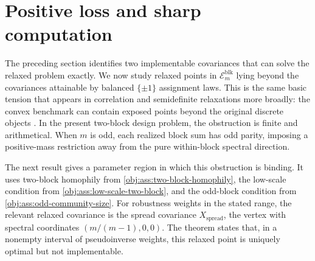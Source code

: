 \section{Positive loss and sharp computation}

The preceding section identifies two implementable covariances that can solve the relaxed problem exactly. We now study relaxed points in \(\mathcal E_m^{\mathrm{blk}}\) lying beyond the covariances attainable by balanced \(\{\pm1\}\) assignment laws. This is the same basic tension that appears in correlation and semidefinite relaxations more broadly: the convex benchmark can contain exposed points beyond the original discrete objects \citep{goemans1995,deza1997}. In the present two-block design problem, the obstruction is finite and arithmetical. When \(m\) is odd, each realized block sum has odd parity, imposing a positive-mass restriction away from the pure within-block spectral direction.

The next result gives a parameter region in which this obstruction is binding. It uses two-block homophily from \cref{obj:ass:two-block-homophily}, the low-scale condition from \cref{obj:ass:low-scale-two-block}, and the odd-block condition from \cref{obj:ass:odd-community-size}. For robustness weights in the stated range, the relevant relaxed covariance is the spread covariance \(X_{\mathrm{spread}}\), the vertex with spectral coordinates \((m/(m-1),0,0)\). The theorem states that, in a nonempty interval of pseudoinverse weights, this relaxed point is uniquely optimal but not implementable.

